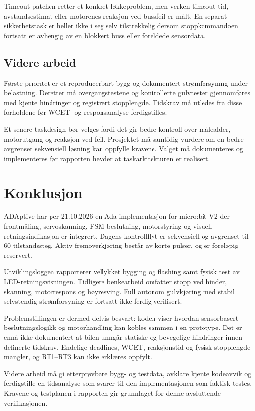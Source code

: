 \documentclass[a4paper,11pt,oneside]{report}
\newcommand{\kode}[1]{\begingroup
 \sbox0{\texttt{\detokenize{#1}}}%
 \ifdim\wd0>150pt\relax
  {\urlstyle{tt}\expandafter\nolinkurl\expandafter{\detokenize{#1}}}%
 \else\usebox0\fi\endgroup}
\begin{document}
Timeout-patchen retter et konkret løkkeproblem, men verken timeout-tid,
avstandsestimat eller motorenes reaksjon ved bussfeil er målt. En separat
sikkerhetstask er heller ikke i seg selv tilstrekkelig dersom stoppkommandoen
fortsatt er avhengig av en blokkert buss eller foreldede sensordata.

\section{Videre arbeid}
Første prioritet er et reproducerbart bygg og dokumentert strømforsyning
under belastning. Deretter må overgangstestene og kontrollerte gulvtester
gjennomføres med kjente hindringer og registrert stopplengde. Tidskrav må
utledes fra disse forholdene før WCET- og responsanalyse ferdigstilles.

Et senere taskdesign bør velges fordi det gir bedre kontroll over
målealder, motorutgang og reaksjon ved feil. Prosjektet må samtidig
vurdere om en bedre avgrenset sekvensiell løsning kan oppfylle kravene.
Valget må dokumenteres og implementeres før rapporten hevder at
taskarkitekturen er realisert.

\chapter{Konklusjon}\label{ch:konklusjon}
ADAptive har per 21.10.2026 en Ada-implementasjon for micro:bit V2 der
frontmåling, servoskanning, FSM-beslutning, motorstyring og visuell
retningsindikasjon er integrert. Dagens kontrollflyt er sekvensiell og
avgrenset til 60 tilstandssteg. Aktiv fremoverkjøring består av korte
pulser, og \kode{Reverse_Drive} er foreløpig reservert.

Utviklingsloggen rapporterer vellykket bygging og flashing samt fysisk
test av LED-retningsvisningen. Tidligere benkearbeid omfatter stopp ved hinder,
skanning, motorrespons og høyresving. Full autonom gulvkjøring med stabil
selvstendig strømforsyning er fortsatt ikke ferdig verifisert.

Problemstillingen er dermed delvis besvart: koden viser hvordan
sensorbasert beslutningslogikk og motorhandling kan kobles sammen i
en prototype. Det er ennå ikke dokumentert at bilen unngår statiske og
bevegelige hindringer innen definerte tidskrav. Endelige deadlines, WCET,
reaksjonstid og fysisk stopplengde mangler, og RT1--RT3 kan ikke erklæres
oppfylt.

Videre arbeid må gi etterprøvbare bygg- og testdata, avklare kjente kodeavvik
og ferdigstille en tidsanalyse som svarer til den implementasjonen som
faktisk testes. Kravene og testplanen i rapporten gir grunnlaget for denne
avsluttende verifikasjonen.
\end{document}
